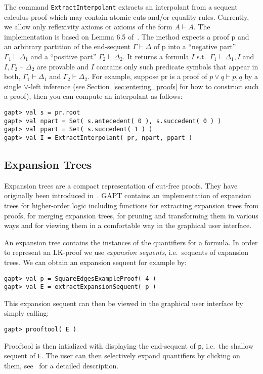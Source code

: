 \documentclass[a4paper,11pt]{article}
\newcommand{\seq}{\vdash}	%
\renewcommand{\lor}{\vee}
\newcommand{\cli}[1]{{\tt {#1}}}
\begin{document}
The command \texttt{ExtractInterpolant} extracts an interpolant from a sequent calculus proof which may contain atomic cuts and/or equality rules. Currently, we allow only reflexivity axioms or axioms of the form $A \seq A$. The implementation is based on Lemma 6.5 of~\cite{Takeuti87Proof}. The method expects
a proof p and an arbitrary partition of the end-sequent $\Gamma \seq \Delta$ of p into a 
``negative part'' $\Gamma_1\seq\Delta_1$ and a ``positive part'' $\Gamma_2 \seq \Delta_2$.
It returns a formula $I$ s.t.\ $\Gamma_1\seq\Delta_1, I$ and $I,\Gamma_2\seq\Delta_2$
are provable and $I$ contains only such predicate symbols that appear in both, $\Gamma_1\seq\Delta_1$
and $\Gamma_2\seq\Delta_2$. For example, suppose pr is a proof of $p \lor q \seq p, q$
by a single $\lor$-left inference (see Section~\ref{sec:entering_proofs} for how to construct
such a proof), then you can compute an interpolant as follows:
\begin{lstlisting}
gapt> val s = pr.root
gapt> val npart = Set( s.antecedent( 0 ), s.succedent( 0 ) )
gapt> val ppart = Set( s.succedent( 1 ) )
gapt> val I = ExtractInterpolant( pr, npart, ppart )
\end{lstlisting}

\subsection{Expansion Trees}

Expansion trees are a compact representation of cut-free proofs. They have originally been
introduced in~\cite{Miller87Compact}. GAPT contains an implementation of
expansion trees for higher-order logic including functions for extracting expansion
trees from proofs, for merging expansion trees, for pruning and transforming them
in various ways and for viewing them in a comfortable way in the graphical user interface.

An expansion tree contains the instances of the quantifiers for a formula. In order
to represent an LK-proof we use {\em expansion sequents}, i.e.~sequents of expansion trees.
We can obtain an expansion sequent for example by:
\begin{lstlisting}
gapt> val p = SquareEdgesExampleProof( 4 )
gapt> val E = extractExpansionSequent( p )
\end{lstlisting}
This expansion sequent can then be viewed in the graphical user interface by simply calling:
\begin{lstlisting}
gapt> prooftool( E )
\end{lstlisting}
Prooftool is then intialized with displaying the end-sequent of \cli{p}, i.e.\ the shallow sequent
of \cli{E}. The user can then selectively expand quantifiers by clicking on them, see~\cite{Hetzl13Understanding}
for a detailed description.
\end{document}
